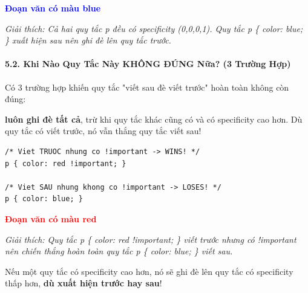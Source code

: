 \begin{browserWindow}
\sffamily\small
\textcolor{blue}{\textbf{Đoạn văn có màu blue}} \par\vspace{4pt}
{\scriptsize\textcolor{gray!60}{\textit{Giải thích: Cả hai quy tắc p đều có specificity (0,0,0,1). Quy tắc p \{ color: blue; \} xuất hiện sau nên ghi đè lên quy tắc trước.}}}
\end{browserWindow}

\paragraph{5.2. Khi Nào Quy Tắc Này KHÔNG ĐÚNG Nữa? (3 Trường Hợp)}

Có 3 trường hợp khiến quy tắc "viết sau đè viết trước" hoàn toàn không còn đúng:

\begin{warnBox}
\textbf{ luôn ghi đè tất cả}, trừ khi quy tắc khác cũng có  và có specificity cao hơn. Dù quy tắc có  viết trước, nó vẫn thắng quy tắc viết sau!
\end{warnBox}

\begin{codeWindow}
\begin{lstlisting}[language=CSS3]
/* Viet TRUOC nhung co !important -> WINS! */
p { color: red !important; }

/* Viet SAU nhung khong co !important -> LOSES! */
p { color: blue; }
\end{lstlisting}
\end{codeWindow}

\begin{browserWindow}
\sffamily\small
\textcolor{red}{\textbf{Đoạn văn có màu red}} \par\vspace{4pt}
{\scriptsize\textcolor{gray!60}{\textit{Giải thích: Quy tắc p \{ color: red !important; \} viết trước nhưng có !important nên chiến thắng hoàn toàn quy tắc p \{ color: blue; \} viết sau.}}}
\end{browserWindow}

\begin{warnBox}
Nếu một quy tắc có specificity cao hơn, nó sẽ ghi đè lên quy tắc có specificity thấp hơn, \textbf{dù xuất hiện trước hay sau}!
\end{warnBox}

